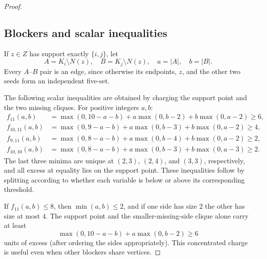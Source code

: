 \begin{proof}
\subsection*{Blockers and scalar inequalities}

If $z\in Z$ has support exactly $\{i,j\}$, let
\[
A=K_i\setminus N(z),\quad B=K_j\setminus N(z),\quad
a=|A|,\quad b=|B|.
\]
Every $A$--$B$ pair is an edge, since otherwise its endpoints, $z$, and the other two seeds form an independent five-set.

The following scalar inequalities are obtained by charging the support point and the two missing cliques. For positive integers $a,b$:
\begin{align}
f_{11}(a,b)&=
\max(0,10-a-b)+a\max(0,b-2)+b\max(0,a-2)\geq6,\label{eq:f11}\\
f_{10,11}(a,b)&=
\max(0,9-a-b)+a\max(0,b-3)+b\max(0,a-2)\geq4,\label{eq:f1011}\\
f_{9,11}(a,b)&=
\max(0,8-a-b)+a\max(0,b-4)+b\max(0,a-2)\geq2,\label{eq:f911}\\
f_{10,10}(a,b)&=
\max(0,8-a-b)+a\max(0,b-3)+b\max(0,a-3)\geq2.\label{eq:f1010}
\end{align}
The last three minima are unique at $(2,3)$, $(2,4)$, and $(3,3)$, respectively, and all excess at equality lies on the support point. These inequalities follow by splitting according to whether each variable is below or above its corresponding threshold.

If $f_{11}(a,b)\leq8$, then $\min(a,b)\leq2$, and if one side has size $2$ the other has size at most $4$. The support point and the smaller-missing-side clique alone carry at least
\begin{equation}
\max(0,10-a-b)+a\max(0,b-2)\geq6
\label{eq:small-side-six}
\end{equation}
units of excess (after ordering the sides appropriately). This concentrated charge is useful even when other blockers share vertices.


\end{proof}
